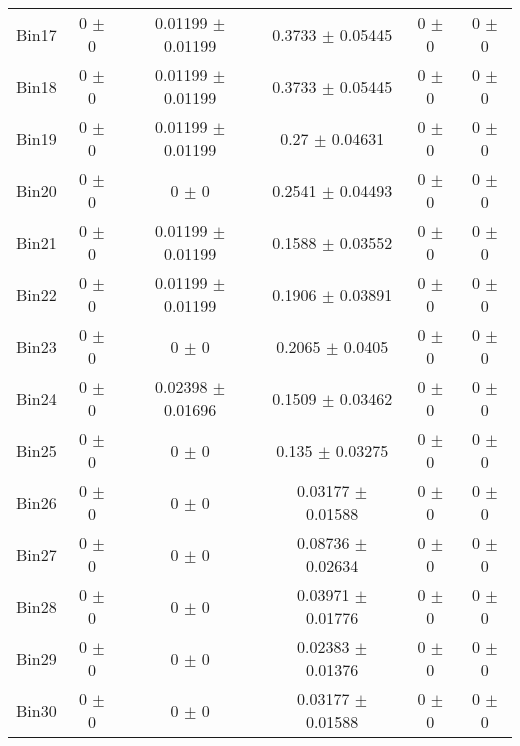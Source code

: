 \begin{tabular}{@{\extracolsep{4pt}}lccccc@{}}
     Bin17 & 0 $\pm$ 0 & 0.01199 $\pm$ 0.01199 & 0.3733 $\pm$ 0.05445 & 0 $\pm$ 0 & 0 $\pm$ 0 \\ 
     Bin18 & 0 $\pm$ 0 & 0.01199 $\pm$ 0.01199 & 0.3733 $\pm$ 0.05445 & 0 $\pm$ 0 & 0 $\pm$ 0 \\ 
     Bin19 & 0 $\pm$ 0 & 0.01199 $\pm$ 0.01199 & 0.27 $\pm$ 0.04631 & 0 $\pm$ 0 & 0 $\pm$ 0 \\ 
     Bin20 & 0 $\pm$ 0 & 0 $\pm$ 0 & 0.2541 $\pm$ 0.04493 & 0 $\pm$ 0 & 0 $\pm$ 0 \\ 
     Bin21 & 0 $\pm$ 0 & 0.01199 $\pm$ 0.01199 & 0.1588 $\pm$ 0.03552 & 0 $\pm$ 0 & 0 $\pm$ 0 \\ 
     Bin22 & 0 $\pm$ 0 & 0.01199 $\pm$ 0.01199 & 0.1906 $\pm$ 0.03891 & 0 $\pm$ 0 & 0 $\pm$ 0 \\ 
     Bin23 & 0 $\pm$ 0 & 0 $\pm$ 0 & 0.2065 $\pm$ 0.0405 & 0 $\pm$ 0 & 0 $\pm$ 0 \\ 
     Bin24 & 0 $\pm$ 0 & 0.02398 $\pm$ 0.01696 & 0.1509 $\pm$ 0.03462 & 0 $\pm$ 0 & 0 $\pm$ 0 \\ 
     Bin25 & 0 $\pm$ 0 & 0 $\pm$ 0 & 0.135 $\pm$ 0.03275 & 0 $\pm$ 0 & 0 $\pm$ 0 \\ 
     Bin26 & 0 $\pm$ 0 & 0 $\pm$ 0 & 0.03177 $\pm$ 0.01588 & 0 $\pm$ 0 & 0 $\pm$ 0 \\ 
     Bin27 & 0 $\pm$ 0 & 0 $\pm$ 0 & 0.08736 $\pm$ 0.02634 & 0 $\pm$ 0 & 0 $\pm$ 0 \\ 
     Bin28 & 0 $\pm$ 0 & 0 $\pm$ 0 & 0.03971 $\pm$ 0.01776 & 0 $\pm$ 0 & 0 $\pm$ 0 \\ 
     Bin29 & 0 $\pm$ 0 & 0 $\pm$ 0 & 0.02383 $\pm$ 0.01376 & 0 $\pm$ 0 & 0 $\pm$ 0 \\ 
     Bin30 & 0 $\pm$ 0 & 0 $\pm$ 0 & 0.03177 $\pm$ 0.01588 & 0 $\pm$ 0 & 0 $\pm$ 0 \\ 
\hline\hline
  \end{tabular}
